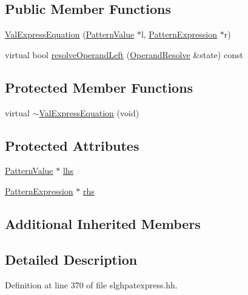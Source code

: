 \subsection*{Public Member Functions}
\begin{DoxyCompactItemize}
\item 
\mbox{\hyperlink{class_val_express_equation_ae2ba4d8d94c4c9d19eb64fd51af0b0bd}{Val\+Express\+Equation}} (\mbox{\hyperlink{class_pattern_value}{Pattern\+Value}} $\ast$l, \mbox{\hyperlink{class_pattern_expression}{Pattern\+Expression}} $\ast$r)
\item 
virtual bool \mbox{\hyperlink{class_val_express_equation_ad13fa9a79e7ff80ed63b0c0e12f395ab}{resolve\+Operand\+Left}} (\mbox{\hyperlink{struct_operand_resolve}{Operand\+Resolve}} \&state) const
\end{DoxyCompactItemize}
\subsection*{Protected Member Functions}
\begin{DoxyCompactItemize}
\item 
virtual \mbox{\hyperlink{class_val_express_equation_ac594d3c5d3a66bae5b532e1f28219c70}{$\sim$\+Val\+Express\+Equation}} (void)
\end{DoxyCompactItemize}
\subsection*{Protected Attributes}
\begin{DoxyCompactItemize}
\item 
\mbox{\hyperlink{class_pattern_value}{Pattern\+Value}} $\ast$ \mbox{\hyperlink{class_val_express_equation_ae2af03dbcb100d38b6aa7b29bf6c5f70}{lhs}}
\item 
\mbox{\hyperlink{class_pattern_expression}{Pattern\+Expression}} $\ast$ \mbox{\hyperlink{class_val_express_equation_a973fad1537c954afff3af4d170019e6e}{rhs}}
\end{DoxyCompactItemize}
\subsection*{Additional Inherited Members}


\subsection{Detailed Description}


Definition at line 370 of file slghpatexpress.\+hh.



